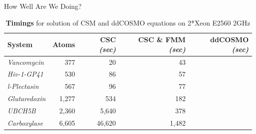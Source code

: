 \begin{frame}{How Well Are We Doing?}
{\vfill



{\footnotesize
\begin{center}
\begin{table}
	\begin{tabular}{ lrrrr  }
\toprule[0.1em] 
{\bf System}	& {\bf Atoms}	& {\bf CSC} {\sl(sec)} & {\bf CSC \& FMM} {\sl(sec)} & {\bf ddCOSMO} {\sl(sec)} \\
\midrule[0.08em]
{\sl Vancomycin}	& 377	& 20  	& 43 		&  \phantom{$<\,$1} \\
{\sl Hiv-1-GP41} 	& 530	& 86		& 57 		& \\
{\sl l-Plectasin} 		& 567	& 96		& 77		&  \\
{\sl Glutaredoxin} 	& 1,277 	& 534 	& 182 	& \\
{\sl UBCH5B}		& 2,360 	& 5,640	& 378 	& \\
{\sl Carboxylase} 	& 6,605	& 46,620 	& 1,482	& \\
\bottomrule[0.1em]
	\end{tabular}
		\caption{\scriptsize {\bf Timings} for solution of CSM and ddCOSMO equations on 2*Xeon E2560 2GHz}
		\end{table}
\end{center}
}

}


\end{frame}
